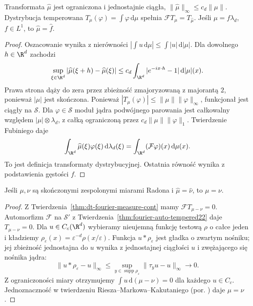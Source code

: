 \begin{twierdzenie}
\label{thm:dt-fourier-measure-cont}
Transformata $\widehat\mu$ jest ograniczona i jednostajnie
ciągła, $\|\widehat\mu\|_\infty\le c_d\|\mu\|$.
Dystrybucja temperowana
$T_\mu(\varphi)=\int\varphi\,\mathrm d\mu$
spełnia $\mathcal FT_\mu=T_{\widehat\mu}$.
Jeśli $\mu=f\lambda_d$, $f\in L^1$, to $\widehat\mu=\widehat f$.
\end{twierdzenie}
\begin{proof}
Oszacowanie wynika z nierówności
$|\int u\,\mathrm d\mu|\le\int|u|\,\mathrm d|\mu|$.
Dla dowolnego $h\in\R^d$ zachodzi
\[
 \sup_{\xi\in\R^d}|\widehat\mu(\xi+h)-\widehat\mu(\xi)|
 \le c_d\int_{\R^d}|e^{-ix\cdot h}-1|\,\mathrm d|\mu|(x).
\]
Prawa strona dąży do zera przez zbieżność zmajoryzowaną
z majorantą $2$, ponieważ $|\mu|$ jest skończona.
Ponieważ $|T_\mu(\varphi)|\le\|\mu\|\|\varphi\|_\infty$,
funkcjonał jest ciągły na $\mathcal S$.
Dla $\varphi\in\mathcal S$ moduł jądra podwójnego
parowania jest całkowalny względem
$|\mu|\otimes\lambda_d$, z całką ograniczoną przez
$c_d\|\mu\|\|\varphi\|_1$. Twierdzenie Fubiniego daje
\[
 \int_{\R^d}\widehat\mu(\xi)\varphi(\xi)\,\mathrm d\lambda_d(\xi)
 =\int_{\R^d}(\mathcal F\varphi)(x)\,\mathrm d\mu(x).
\]
To jest definicja transformaty dystrybucyjnej.
Ostatnia równość wynika z podstawienia gęstości $f$.
\end{proof}

\begin{twierdzenie}
\label{thm:dt-fourier-measure-unique}
Jeśli $\mu,\nu$ są skończonymi zespolonymi miarami Radona
i $\widehat\mu=\widehat\nu$, to $\mu=\nu$.
\end{twierdzenie}
\begin{proof}
Z Twierdzenia~\ref{thm:dt-fourier-measure-cont} mamy
$\mathcal FT_{\mu-\nu}=0$. Automorfizm $\mathcal F$ na
$\mathcal S'$ z Twierdzenia~\ref{thm:fourier-auto-tempered22}
daje $T_{\mu-\nu}=0$.
Dla $u\in C_c(\R^d)$ wybieramy nieujemną funkcję testową
$\rho$ o całce jeden i kładziemy
$\rho_\varepsilon(x)=\varepsilon^{-d}\rho(x/\varepsilon)$.
Funkcja $u*\rho_\varepsilon$ jest gładka o zwartym nośniku;
jej zbieżność jednostajna do $u$ wynika z jednostajnej
ciągłości $u$ i zwężającego się nośnika jądra:
\[
 \|u*\rho_\varepsilon-u\|_\infty
 \le\sup_{y\in\operatorname{supp}\rho_\varepsilon}
        \|\tau_yu-u\|_\infty\to0.
\]
Z ograniczoności miary otrzymujemy
$\int u\,\mathrm d(\mu-\nu)=0$ dla każdego $u\in C_c$.
Jednoznaczność w twierdzeniu Riesza--Markowa--Kakutaniego
(por. )
daje $\mu=\nu$.
\end{proof}


